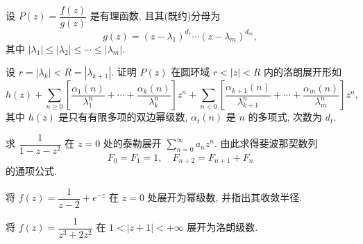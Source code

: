 \begin{exercise}
	设 $P(z)=\dfrac{f(z)}{g(z)}$ 是有理函数, 且其(既约)分母为
	\[g(z)=(z-\lambda_1)^{d_1}\cdots(z-\lambda_m)^{d_m},\]
	其中 $|\lambda_1|\le|\lambda_2|\le\cdots\le|\lambda_m|$.
	
	设 $r=|\lambda_k|<R=|\lambda_{k+1}|$. 证明 $P(z)$ 在圆环域 $r<|z|<R$ 内的洛朗展开形如
	\[h(z)+\sum_{n\ge 0}\left[\frac{\alpha_1(n)}{\lambda_1^n}+\cdots+\frac{\alpha_k(n)}{\lambda_k^n}\right]z^n
	+\sum_{n<0}\left[\frac{\alpha_{k+1}(n)}{\lambda_{k+1}^n}+\cdots+\frac{\alpha_m(n)}{\lambda_m^n}\right]z^n,\]
	其中 $h(z)$ 是只有有限多项的双边幂级数, $\alpha_t(n)$ 是 $n$ 的多项式, 次数为 $d_t$.
\end{exercise}


\item 求 $\dfrac{1}{1-z-z^2}$ 在 $z=0$ 处的泰勒展开 $\displaystyle\sum_{n=0}^\infty a_nz^n$. 由此求得斐波那契数列
  \[F_0=F_1=1,\quad F_{n+2}=F_{n+1}+F_n\]
的通项公式.
\item 将 $f(z)=\dfrac{1}{z-2}+e^{-z}$ 在 $z=0$ 处展开为幂级数, 并指出其收敛半径.
\item 将 $f(z)=\dfrac{1}{z^3+2z^2}$ 在 $1<|z+1|<+\infty$ 展开为洛朗级数.

